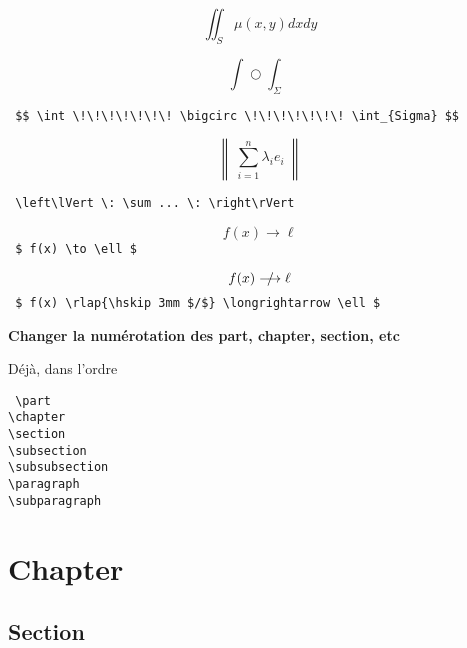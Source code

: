 \documentclass{report}
\begin{document}
\begin{center} 

$$ \iint_{S} \mu(x,y) dxdy $$

$$ \int \!\!\!\!\!\! \bigcirc \!\!\!\!\!\! \int_{\Sigma} $$

\texttt{
\$\$ \textbackslash{}int \textbackslash{}!\textbackslash{}!\textbackslash{}!\textbackslash{}!\textbackslash{}!\textbackslash{}!\textbackslash{}! \textbackslash{}bigcirc \textbackslash{}!\textbackslash{}!\textbackslash{}!\textbackslash{}!\textbackslash{}!\textbackslash{}!\textbackslash{}! \textbackslash{}int\_\{Sigma\} \$\$
}

$$ \left\lVert \: \sum_{i=1}^{n} \lambda_i e_i \: \right\rVert $$ 

\texttt{
\textbackslash{}left\textbackslash{}lVert \textbackslash{}\!\!\!: \textbackslash{}sum ... \textbackslash{}\!\!\!: \textbackslash{}right\textbackslash{}rVert
}


$$ f(x) \to \ell $$ 
\texttt{ \$ f(x) \textbackslash{}to \textbackslash{}ell \$} 

$$ f(x) \rlap{\hskip 3mm $/$} \longrightarrow \ell $$ 
\texttt{ \$ f(x) \textbackslash{}rlap\{\textbackslash{}hskip 3mm \$/\$\} \textbackslash{}longrightarrow \textbackslash{}ell \$}

\end{center}

\bigskip
\bigskip
\bigskip

\Large \textbf{Changer la numérotation des part, chapter, section, etc}

\normalsize

Déjà, dans l'ordre

\texttt{ \textbackslash{}part \\ \textbackslash{}chapter \\ \textbackslash{}section \\ \textbackslash{}subsection \\ \textbackslash{}subsubsection \\ \textbackslash{}paragraph \\ \textbackslash{}subparagraph }

\chapter{Chapter}

\section{Section}
\end{document}

